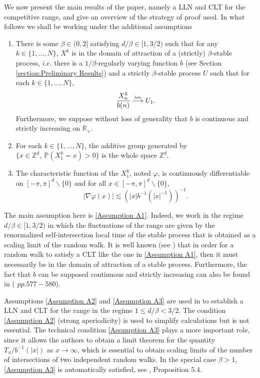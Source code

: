 \documentclass[10pt,a4paper]{amsart}
\newcommand{\RR}{\mathbb R}
\newcommand{\PP}{\mathbb P}
\newcommand{\1}{\mathds{1}}
\newcommand{\ZZ}{\mathbb Z}
\newcommand{\distribution}{\stackrel{\scaleto{\mathrm{law}}{4pt}}{\longrightarrow}}
\numberwithin{equation}{section}
\begin{document}
We now present the main results of the paper, namely a LLN and CLT for the competitive range, and give an overview of the strategy of proof used. In what follows we shall be working under the additional assumptions
\begin{enumerate}[label=(A\arabic*)]
    \item
    \label{Assumption A1}
    There is some $\beta\in(0,2]$ satisfying $d/\beta\in[1,3/2)$ such that   for any $k\in\{1,\dots,N\}$, $X^k$ is in the domain of attraction of a (strictly) $\beta$-stable process, $i.e.$ there is a $1/\beta$-regularly varying function $b$ (see Section \ref{section:Preliminary Results}) and a strictly $\beta$-stable process $U$ such that for each $k\in\{1,\dots,N\}$,
    \begin{equation*}
        \frac{X_n^k}{b(n)}\distribution U_1.
    \end{equation*}
    Furthermore, we suppose without loss of generality that $b$ is continuous and strictly increasing on $\RR_+$. 
    \item
    \label{Assumption A2}
    For each $k\in\{1,\dots,N\}$, the additive group generated by $\{x\in\ZZ^d,\ \PP\left(X_1^k=x\right)>0\}$ is the whole space $\ZZ^d$.
    \item
    \label{Assumption A3}
    The characteristic function of the $X_1^k$, noted $\varphi$, is continuously differentiable on $[-\pi,\pi]^d\backslash\{0\}$ and for all $x\in[-\pi,\pi]^d\backslash\{0\}$,
    \begin{equation*}
        |\nabla\varphi(x)|\lesssim\left(|x| b^{-1}(|x|^{-1})\right)^{-1}.
    \end{equation*}
\end{enumerate}

The main assumption here is \ref{Assumption A1}. Indeed, we work in the regime $d/\beta\in[1,3/2)$ in which the fluctuations of the range are given by the renormalized self-intersection local time of the stable process that is obtained as a scaling limit of the random walk. It is well known (see \cite{feller1991introduction}) that in order for a random walk to satisfy a CLT like the one in \ref{Assumption A1}, then it must necessarily be in the domain of attraction of a stable process. Furthermore, the fact that $b$ can be supposed continuous and strictly increasing can also be found in (\cite{feller1991introduction} $pp. 577-580$).

Assumptions \ref{Assumption A2} and \ref{Assumption A3} are used in \cite{LeGallRosenRangeOfStableRandomWalks1991} to establish a LLN and CLT for the range in the regime $1\le d/\beta<3/2$. The condition \ref{Assumption A2} (strong aperiodicity) is used to simplify calculations but is not essential. The technical condition \ref{Assumption A3} plays a more important role, since it allows the authors to obtain a limit theorem for the quantity $T_x/b^{-1}(|x|)$ as $x\rightarrow\infty$, which is essential to obtain scaling limits of the number of intersections of two independent random walks. In the special case $\beta>1$, \ref{Assumption A3} is automatically satisfied, see \cite{LeGallRosenRangeOfStableRandomWalks1991}, Proposition $5.4$.
\end{document}
